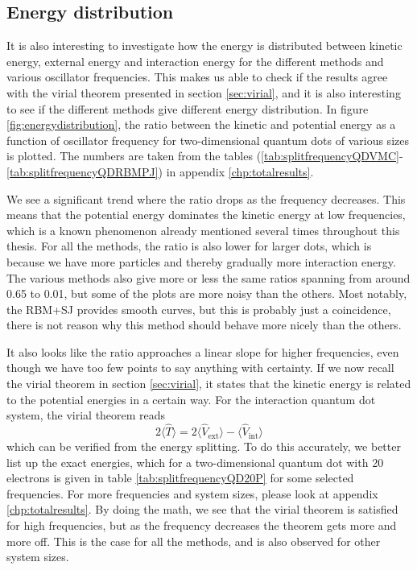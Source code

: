 

\subsection{Energy distribution}
It is also interesting to investigate how the energy is distributed between kinetic energy, external energy and interaction energy for the different methods and various oscillator frequencies. This makes us able to check if the results agree with the virial theorem presented in section \ref{sec:virial}, and it is also interesting to see if the different methods give different energy distribution. In figure \eqref{fig:energydistribution}, the ratio between the kinetic and potential energy as a function of oscillator frequency for two-dimensional quantum dots of various sizes is plotted. The numbers are taken from the tables (\ref{tab:splitfrequencyQDVMC}-\ref{tab:splitfrequencyQDRBMPJ}) in appendix \ref{chp:totalresults}. 

We see a significant trend where the ratio drops as the frequency decreases. This means that the potential energy dominates the kinetic energy at low frequencies, which is a known phenomenon already mentioned several times throughout this thesis. For all the methods, the ratio is also lower for larger dots, which is because we have more particles and thereby gradually more interaction energy. The various methods also give more or less the same ratios spanning from around 0.65 to 0.01, but some of the plots are more noisy than the others. Most notably, the RBM+SJ provides smooth curves, but this is probably just a coincidence, there is not reason why this method should behave more nicely than the others. 

It also looks like the ratio approaches a linear slope for higher frequencies, even though we have too few points to say anything with certainty. If we now recall the virial theorem in section \ref{sec:virial}, it states that the kinetic energy is related to the potential energies in a certain way. For the interaction quantum dot system, the virial theorem reads
\begin{equation}
2\langle \hat{T} \rangle=2\langle \hat{V}_{\text{ext}} \rangle-\langle \hat{V}_{\text{int}} \rangle
\end{equation}
which can be verified from the energy splitting. To do this accurately, we better list up the exact energies, which for a two-dimensional quantum dot with 20 electrons is given in table \eqref{tab:splitfrequencyQD20P} for some selected frequencies. For more frequencies and system sizes, please look at appendix \ref{chp:totalresults}. By doing the math, we see that the virial theorem is satisfied for high frequencies, but as the frequency decreases the theorem gets more and more off. This is the case for all the methods, and is also observed for other system sizes. 

